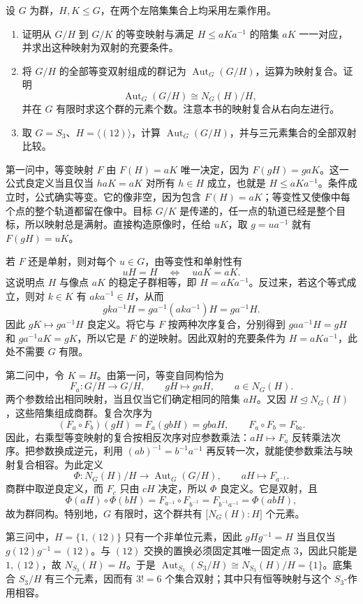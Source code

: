 \begin{exercise}\label{b1:ex:04-7}
	设 \(G\) 为群，\(H,K\leq G\)，在两个左陪集集合上均采用左乘作用。
	\begin{enumerate}
		\item 证明从 \(G/H\) 到 \(G/K\) 的等变映射与满足 \(H\leq aKa^{-1}\) 的陪集 \(aK\) 一一对应，并求出这种映射为双射的充要条件。
		\item 将 \(G/H\) 的全部等变双射组成的群记为 \(\operatorname{Aut}_G(G/H)\)，运算为映射复合。证明
			\[
				\operatorname{Aut}_G(G/H)\cong N_G(H)/H,
			\]
			并在 \(G\) 有限时求这个群的元素个数。注意本书的映射复合从右向左进行。
		\item 取 \(G=S_3\)、\(H=\langle(12)\rangle\)，计算 \(\operatorname{Aut}_G(G/H)\)，并与三元素集合的全部双射比较。
	\end{enumerate}
\end{exercise}
\begin{solution}
	第一问中，等变映射 \(F\) 由 \(F(H)=aK\) 唯一决定，因为 \(F(gH)=gaK\)。这一公式良定义当且仅当 \(haK=aK\) 对所有 \(h\in H\) 成立，也就是 \(H\leq aKa^{-1}\)。条件成立时，公式确实等变。它的像非空，因为包含 \(F(H)=aK\)；等变性又使像中每个点的整个轨道都留在像中。目标 \(G/K\) 是传递的，任一点的轨道已经是整个目标，所以映射总是满射。直接构造原像时，任给 \(uK\)，取 \(g=ua^{-1}\) 就有 \(F(gH)=uK\)。

	若 \(F\) 还是单射，则对每个 \(u\in G\)，由等变性和单射性有
	\[
		uH=H\quad\Longleftrightarrow\quad uaK=aK.
	\]
	这说明点 \(H\) 与像点 \(aK\) 的稳定子群相等，即 \(H=aKa^{-1}\)。反过来，若这个等式成立，则对 \(k\in K\) 有 \(aka^{-1}\in H\)，从而
	\[
		gka^{-1}H=ga^{-1}(aka^{-1})H=ga^{-1}H.
	\]
	因此 \(gK\mapsto ga^{-1}H\) 良定义。将它与 \(F\) 按两种次序复合，分别得到 \(gaa^{-1}H=gH\) 和 \(ga^{-1}aK=gK\)，所以它是 \(F\) 的逆映射。因此双射的充要条件为 \(H=aKa^{-1}\)，此处不需要 \(G\) 有限。

	第二问中，令 \(K=H\)。由第一问，等变自同构恰为
	\[
		F_a:G/H\longrightarrow G/H,\qquad gH\longmapsto gaH,\qquad a\in N_G(H).
	\]
	两个参数给出相同映射，当且仅当它们确定相同的陪集 \(aH\)。又因 \(H\trianglelefteq N_G(H)\)，这些陪集组成商群。复合次序为
	\[
		(F_a\circ F_b)(gH)=F_a(gbH)=gbaH, \qquad F_a\circ F_b=F_{ba}.
	\]
	因此，右乘型等变映射的复合按相反次序对应参数乘法：\(aH\mapsto F_a\) 反转乘法次序。把参数换成逆元，利用 \((ab)^{-1}=b^{-1}a^{-1}\) 再反转一次，就能使参数乘法与映射复合相容。为此定义
	\[
		\Phi:N_G(H)/H\longrightarrow\operatorname{Aut}_G(G/H), \qquad aH\longmapsto F_{a^{-1}}.
	\]
	商群中取逆良定义，而 \(F_c\) 只由 \(cH\) 决定，所以 \(\Phi\) 良定义。它是双射，且
	\[
		\Phi(aH)\circ\Phi(bH) =F_{a^{-1}}\circ F_{b^{-1}} =F_{b^{-1}a^{-1}} =\Phi(abH),
	\]
	故为群同构。特别地，\(G\) 有限时，这个群共有 \(\bigl[N_G(H):H\bigr]\) 个元素。

	第三问中，\(H=\{1,(12)\}\) 只有一个非单位元素，因此 \(gHg^{-1}=H\) 当且仅当 \(g(12)g^{-1}=(12)\)。与 \((12)\) 交换的置换必须固定其唯一固定点 \(3\)，因此只能是 \(1,(12)\)，故 \(N_{S_3}(H)=H\)。于是 \(\operatorname{Aut}_{S_3}(S_3/H)\cong N_{S_3}(H)/H=\{1\}\)。底集合 \(S_3/H\) 有三个元素，因而有 \(3!=6\) 个集合双射；其中只有恒等映射与这个 \(S_3\)-作用相容。
\end{solution}
